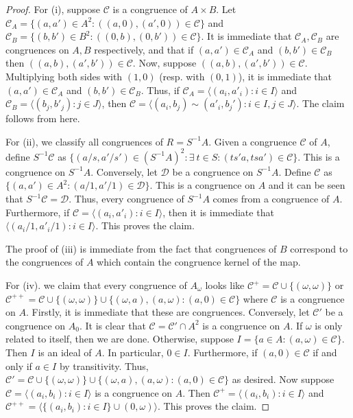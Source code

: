 \documentclass[notitlepage, 10pt]{article}
\theoremstyle{defin}
\theoremstyle{theo}
\theoremstyle{rema}
\newcommand{\cC}{\mathcal{C}}
\newcommand{\cD}{\mathcal{D}}
\begin{document}
\begin{proof}
    For (i), suppose $\cC$ is a congruence of $A\times B$. Let $\cC_A = \{(a,a')\in A^2: ((a,0), (a', 0))\in \cC\}$ and $\cC_B = \{(b,b')\in B^2: ((0,b), (0,b'))\in \cC\}$. It is immediate that $\cC_A, \cC_B$ are congruences on $A, B$ respectively, and that if $(a,a')\in \cC_A$ and $(b,b')\in \cC_B$ then $((a,b), (a',b'))\in \cC$. Now, suppose $((a,b),(a',b'))\in \cC$. Multiplying both sides with $(1,0)$ (resp. with $(0,1)$), it is immediate that $(a,a')\in \cC_A$ and $(b,b')\in \cC_B$. Thus, if $\cC_A =\langle (a_i, a'_i) : i\in I\rangle$ and $\cC_B =\langle (b_j, b'_j) : j\in J\rangle$, then $\cC = \langle (a_i, b_j) \sim (a'_i, b_j'):i\in I, j\in J\rangle$. The claim follows from here. 

    For (ii), we classify all congruences of $R =S^{-1}A$. Given a congruence $\cC$ of $A$, define $S^{-1}\cC$ as $\{ (a/s, a'/s')\in (S^{-1}A)^2 : \exists\> t\in S : (ts'a, tsa')\in \cC\}$. This is a congruence on $S^{-1}A$. Conversely, let $\cD$ be a congruence on $S^{-1}A$. Define $\cC$ as $\{(a,a')\in A^2 : (a/1, a'/1)\in \cD\}$. This is a congruence on $A$ and it can be seen that $S^{-1}\cC= \cD$. Thus, every congruence of $S^{-1}A$ comes from a congruence of $A$. Furthermore, if $\cC = \langle (a_i, a'_i) : i\in I\rangle$, then it is immediate that $\langle (a_i/1, a'_i/1) : i\in I\rangle$. This proves the claim.

    The proof of (iii) is immediate from the fact that congruences of $B$ correspond to the congruences of $A$ which contain the congruence kernel of the map. 

    For (iv). we claim that every congruence of $A_\omega$ looks like $\cC^{+} = \cC \cup \{(\omega, \omega)\} $ or $\cC^{++} =\cC \cup \{(\omega, \omega)\}\cup \{ (\omega , a), (a,\omega) : (a,0)\in \cC\}$ where $\cC$ is a congruence on $A$. Firstly, it is immediate that these are congruences. Conversely, let $\cC'$ be a congruence on $A_0$. It is clear that $\cC = \cC'\cap A^2$ is a congruence on $A$. If $\omega$ is only related to itself, then we are done. Otherwise, suppose $I = \{a\in A : (a, \omega)\in \cC\}$. Then $I$ is an ideal of $A$. In particular, $0\in I$. Furthermore, if $(a,0)\in \cC$ if and only if $a\in I$ by transitivity. Thus, $\cC' = \cC \cup \{(\omega, \omega)\}\cup \{ (\omega , a), (a,\omega) : (a,0)\in \cC\}$ as desired. Now suppose $\cC = \langle (a_i,b_i) : i\in I\rangle $ is a congruence on $A$. Then $\cC^{+} = \langle (a_i,b_i) : i\in I\rangle $ and $\cC^{++} = \langle \{(a_i,b_i) : i\in I\} \cup (0, \omega)\rangle$. This proves the claim.


\end{proof}
\end{document}
